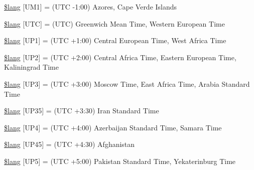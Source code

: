 \begin{DoxyCompactItemize}
\item 
\hyperlink{_admin_2system_2language_2english_2date__lang_8php_a036e0074236b996b33231b051eda2973}{\$lang} \mbox{[}\textquotesingle{}U\+M1\textquotesingle{}\mbox{]} = \textquotesingle{}(U\+T\+C -\/1\+:00) Azores, Cape Verde Islands\textquotesingle{}
\item 
\hyperlink{_admin_2system_2language_2english_2date__lang_8php_ab153b3219e74743184b7dee67e86f9fc}{\$lang} \mbox{[}\textquotesingle{}U\+T\+C\textquotesingle{}\mbox{]} = \textquotesingle{}(U\+T\+C) Greenwich Mean Time, Western European Time\textquotesingle{}
\item 
\hyperlink{_admin_2system_2language_2english_2date__lang_8php_a788996558e6c8cafd788a1fef6b0be4e}{\$lang} \mbox{[}\textquotesingle{}U\+P1\textquotesingle{}\mbox{]} = \textquotesingle{}(U\+T\+C +1\+:00) Central European Time, West Africa Time\textquotesingle{}
\item 
\hyperlink{_admin_2system_2language_2english_2date__lang_8php_adfeba045961d07f8f30c0f1a7b8b4ff9}{\$lang} \mbox{[}\textquotesingle{}U\+P2\textquotesingle{}\mbox{]} = \textquotesingle{}(U\+T\+C +2\+:00) Central Africa Time, Eastern European Time, Kaliningrad Time\textquotesingle{}
\item 
\hyperlink{_admin_2system_2language_2english_2date__lang_8php_a5eddd4b83edcbefcc883077949d40a67}{\$lang} \mbox{[}\textquotesingle{}U\+P3\textquotesingle{}\mbox{]} = \textquotesingle{}(U\+T\+C +3\+:00) Moscow Time, East Africa Time, Arabia Standard Time\textquotesingle{}
\item 
\hyperlink{_admin_2system_2language_2english_2date__lang_8php_ad669ea69fd450762d029592b6ac64395}{\$lang} \mbox{[}\textquotesingle{}U\+P35\textquotesingle{}\mbox{]} = \textquotesingle{}(U\+T\+C +3\+:30) Iran Standard Time\textquotesingle{}
\item 
\hyperlink{_admin_2system_2language_2english_2date__lang_8php_ad0131a14a1ede9328baf1a1827602f45}{\$lang} \mbox{[}\textquotesingle{}U\+P4\textquotesingle{}\mbox{]} = \textquotesingle{}(U\+T\+C +4\+:00) Azerbaijan Standard Time, Samara Time\textquotesingle{}
\item 
\hyperlink{_admin_2system_2language_2english_2date__lang_8php_a7795735f3608127d726a4fca3f87dc79}{\$lang} \mbox{[}\textquotesingle{}U\+P45\textquotesingle{}\mbox{]} = \textquotesingle{}(U\+T\+C +4\+:30) Afghanistan\textquotesingle{}
\item 
\hyperlink{_admin_2system_2language_2english_2date__lang_8php_a08236ffa5ff4db9f2bc023f5256fead1}{\$lang} \mbox{[}\textquotesingle{}U\+P5\textquotesingle{}\mbox{]} = \textquotesingle{}(U\+T\+C +5\+:00) Pakistan Standard Time, Yekaterinburg Time\textquotesingle{}

\end{DoxyCompactItemize}

